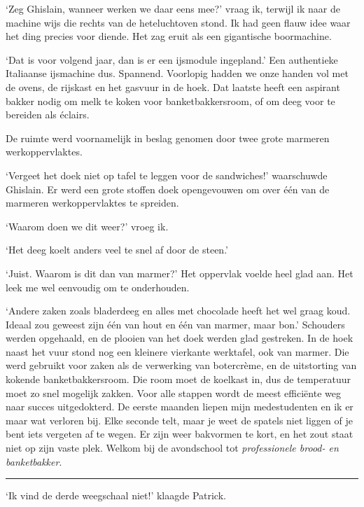 \documentclass[
  11pt,
  dutch,
]{memoir}
\begin{document}
`Zeg Ghislain, wanneer werken we daar eens mee?' vraag ik, terwijl ik
naar de machine wijs die rechts van de heteluchtoven stond. Ik had geen
flauw idee waar het ding precies voor diende. Het zag eruit als een
gigantische boormachine.

`Dat is voor volgend jaar, dan is er een ijsmodule ingepland.' Een
authentieke Italiaanse ijsmachine dus. Spannend. Voorlopig hadden we
onze handen vol met de ovens, de rijskast en het gasvuur in de hoek. Dat
laatste heeft een aspirant bakker nodig om melk te koken voor
banketbakkersroom, of om deeg voor te bereiden als éclairs.

De ruimte werd voornamelijk in beslag genomen door twee grote marmeren
werkoppervlaktes.

`Vergeet het doek niet op tafel te leggen voor de sandwiches!'
waarschuwde Ghislain. Er werd een grote stoffen doek opengevouwen om
over één van de marmeren werkoppervlaktes te spreiden.

`Waarom doen we dit weer?' vroeg ik.

`Het deeg koelt anders veel te snel af door de steen.'

`Juist. Waarom is dit dan van marmer?' Het oppervlak voelde heel glad
aan. Het leek me wel eenvoudig om te onderhouden.

`Andere zaken zoals bladerdeeg en alles met chocolade heeft het wel
graag koud. Ideaal zou geweest zijn één van hout en één van marmer, maar
bon.' Schouders werden opgehaald, en de plooien van het doek werden glad
gestreken. In de hoek naast het vuur stond nog een kleinere vierkante
werktafel, ook van marmer. Die werd gebruikt voor zaken als de
verwerking van botercrème, en de uitstorting van kokende
banketbakkersroom. Die room moet de koelkast in, dus de temperatuur moet
zo snel mogelijk zakken. Voor alle stappen wordt de meest efficiënte weg
naar succes uitgedokterd. De eerste maanden liepen mijn medestudenten en
ik er maar wat verloren bij. Elke seconde telt, maar je weet de spatels
niet liggen of je bent iets vergeten af te wegen. Er zijn weer bakvormen
te kort, en het zout staat niet op zijn vaste plek. Welkom bij de
avondschool tot \emph{professionele brood- en banketbakker}.

\pfbreak

`Ik vind de derde weegschaal niet!' klaagde Patrick.
\end{document}
